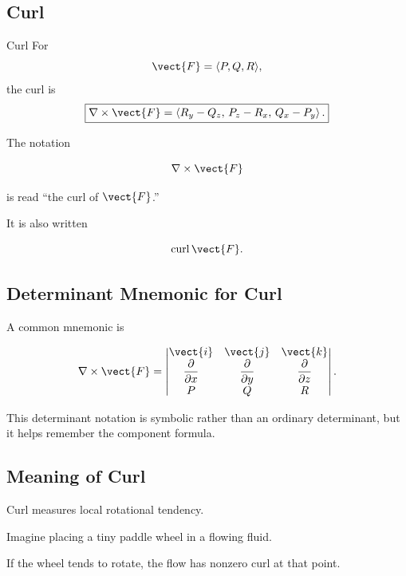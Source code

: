 \subsection{Curl}
\label{subsec:curl}

\begin{definitionbox}{Curl}
For
\[ \vect{F}=\langle P,Q,R\rangle, \]
the curl is
\[ \boxed{
\nabla\times\vect{F}
=
\left\langle
R_y-Q_z,\,
P_z-R_x,\,
Q_x-P_y
\right\rangle.
} \]
\end{definitionbox}

The notation

\[ \nabla\times\vect{F} \]

is read ``the curl of \(\vect{F}\).''

It is also written

\[ \operatorname{curl}\vect{F}. \]

\subsection{Determinant Mnemonic for Curl}
\label{subsec:curl-determinant}

A common mnemonic is

\[
\nabla\times\vect{F}
=
\begin{vmatrix}
\vect{i} & \vect{j} & \vect{k}\\
\dfrac{\partial}{\partial x} &
\dfrac{\partial}{\partial y} &
\dfrac{\partial}{\partial z}\\
P & Q & R
\end{vmatrix}.
\]

This determinant notation is symbolic rather than an ordinary determinant,
but it helps remember the component formula.

\subsection{Meaning of Curl}
\label{subsec:meaning-curl}

Curl measures local rotational tendency.

Imagine placing a tiny paddle wheel in a flowing fluid.

If the wheel tends to rotate, the flow has nonzero curl at that point.

